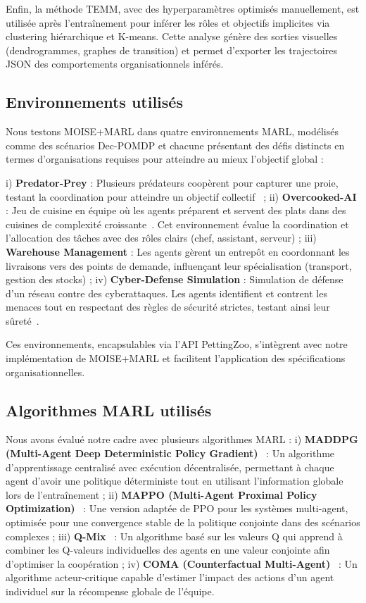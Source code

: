 \documentclass[final]{jfsma}
\begin{document}
Enfin, la méthode TEMM, avec des hyperparamètres optimisés manuellement, est utilisée après l'entraînement pour inférer les rôles et objectifs implicites via clustering hiérarchique et K-means. Cette analyse génère des sorties visuelles (dendrogrammes, graphes de transition) et permet d'exporter les trajectoires JSON des comportements organisationnels inférés.

\subsection{Environnements utilisés}

Nous testons MOISE+MARL dans quatre environnements MARL, modélisés comme des scénarios Dec-POMDP et chacune présentant des défis distincts en termes d'organisations requises pour atteindre au mieux l'objectif global :

i) \textbf{Predator-Prey} : Plusieurs prédateurs coopèrent pour capturer une proie, testant la coordination pour atteindre un objectif collectif~\cite{lowe2017multi}
; \quad
ii) \textbf{Overcooked-AI} : Jeu de cuisine en équipe où les agents préparent et servent des plats dans des cuisines de complexité croissante~\cite{overcookedai}. Cet environnement évalue la coordination et l'allocation des tâches avec des rôles clairs (chef, assistant, serveur)
; \quad
iii) \textbf{Warehouse Management} : Les agents gèrent un entrepôt en coordonnant les livraisons vers des points de demande, influençant leur spécialisation (transport, gestion des stocks)
; \quad
iv) \textbf{Cyber-Defense Simulation} : Simulation de défense d'un réseau contre des cyberattaques. Les agents identifient et contrent les menaces tout en respectant des règles de sécurité strictes, testant ainsi leur sûreté~\cite{Maxwell2021}.

Ces environnements, encapsulables via l'API PettingZoo, s'intègrent avec notre implémentation de MOISE+MARL et facilitent l'application des spécifications organisationnelles.

\subsection{Algorithmes MARL utilisés}

Nous avons évalué notre cadre avec plusieurs algorithmes MARL :
i) \textbf{MADDPG (Multi-Agent Deep Deterministic Policy Gradient)}~\cite{lowe2017multi} : Un algorithme d'apprentissage centralisé avec exécution décentralisée, permettant à chaque agent d'avoir une politique déterministe tout en utilisant l'information globale lors de l'entraînement
; \quad
ii) \textbf{MAPPO (Multi-Agent Proximal Policy Optimization)}~\cite{yu2021mappo} : Une version adaptée de PPO pour les systèmes multi-agent, optimisée pour une convergence stable de la politique conjointe dans des scénarios complexes
; \quad
iii) \textbf{Q-Mix}~\cite{rashid2018qmix} : Un algorithme basé sur les valeurs Q qui apprend à combiner les Q-valeurs individuelles des agents en une valeur conjointe afin d'optimiser la coopération
; \quad
iv) \textbf{COMA (Counterfactual Multi-Agent)}~\cite{foerster2018counterfactual} : Un algorithme acteur-critique capable d'estimer l'impact des actions d'un agent individuel sur la récompense globale de l'équipe.
\end{document}
